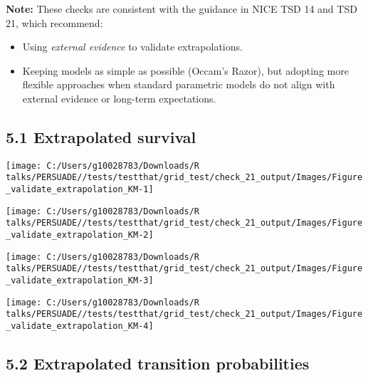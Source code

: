 \documentclass[
]{article}
\providecommand{\tightlist}{%
  \setlength{\itemsep}{0pt}\setlength{\parskip}{0pt}}
\begin{document}
\textbf{Note:} These checks are consistent with the guidance in NICE TSD
14 and TSD 21, which recommend:

\begin{itemize}
\tightlist
\item
  Using \emph{external evidence} to validate extrapolations.\\
\item
  Keeping models as simple as possible (Occam's Razor), but adopting
  more flexible approaches when standard parametric models do not align
  with external evidence or long-term expectations.
\end{itemize}

\subsection{5.1 Extrapolated survival}\label{extrapolated-survival}

\begin{flushleft}\texttt{[image: C:/Users/g10028783/Downloads/R talks/PERSUADE//tests/testthat/grid\_test/check\_21\_output/Images/Figure\_validate\_extrapolation\_KM-1]} \end{flushleft}

\begin{flushleft}\texttt{[image: C:/Users/g10028783/Downloads/R talks/PERSUADE//tests/testthat/grid\_test/check\_21\_output/Images/Figure\_validate\_extrapolation\_KM-2]} \end{flushleft}

\begin{flushleft}\texttt{[image: C:/Users/g10028783/Downloads/R talks/PERSUADE//tests/testthat/grid\_test/check\_21\_output/Images/Figure\_validate\_extrapolation\_KM-3]} \end{flushleft}

\begin{flushleft}\texttt{[image: C:/Users/g10028783/Downloads/R talks/PERSUADE//tests/testthat/grid\_test/check\_21\_output/Images/Figure\_validate\_extrapolation\_KM-4]} \end{flushleft}

\clearpage

\subsection{5.2 Extrapolated transition
probabilities}\label{extrapolated-transition-probabilities}
\end{document}
